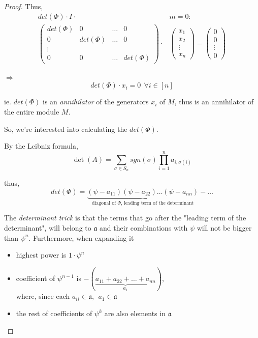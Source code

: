 \documentclass{article}
\theoremstyle{definition}
\newcommand{\aA}{\mathfrak{a}} %
\begin{document}
\begin{proof}
  Thus,
  \begin{align*}
    det(\Phi) \cdot I \cdot &m = 0:\\
  \begin{pmatrix}
    det(\Phi) & 0 & \ldots & 0\\
    0 & det(\Phi) & \ldots & 0\\
    \vdots\\
    0 & 0 & \ldots & det(\Phi)
  \end{pmatrix}
  \cdot
  &\begin{pmatrix}
    x_1\\ x_2\\ \vdots\\ x_n
  \end{pmatrix}
                              =
  \begin{pmatrix}
    0\\ 0\\ \vdots\\ 0
  \end{pmatrix}
  \end{align*}

  $\Longrightarrow$
  \begin{equation}
    det(\Phi) \cdot x_i = 0 ~~\forall i \in [n]
    \label{eq:2.4.3}
  \end{equation}

  ie. $det(\Phi)$ is an \emph{annihilator} of the generators $x_i$ of $M$, thus
  is an annihilator of the entire module $M$.


  So, we're interested into calculating the $det(\Phi)$.

  By the Leibniz formula,
  $$\det(A) = \sum_{\sigma \in S_n} sgn(\sigma) \prod_{i=1}^n a_{i, \sigma(i)}$$

  thus,
  $$det(\Phi) = \underbrace{(\psi - a_{11}) (\psi - a_{22}) \ldots (\psi - a_{nn})}_{\text{diagonal of $\Phi$, leading term of the determinant}} - \ldots$$

  The \emph{determinant trick} is that the terms that go after the "leading term of the determinant", will belong to $\aA$ and their combinations with $\psi$ will not be bigger than $\psi^n$. Furthermore, when expanding it
  \begin{itemize}
    \item highest power is $1 \cdot \psi^n$
    \item coefficient of $\psi^{n-1}$ is $-( \underbrace{ a_{11} + a_{22} + \ldots + a_{nn} }_{a_1})$,\\
      where, since each $a_{ii} \in \aA,~~ a_1 \in \aA$
    \item the rest of coefficients of $\psi^k$ are also elements in $\aA$
  \end{itemize}


\end{proof}
\end{document}
